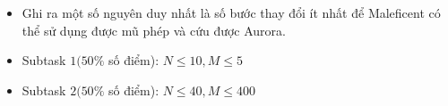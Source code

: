 \documentclass[12pt,a4paper,oneside]{article}
\begin{document}
\begin{itemize}
    \item Ghi ra một số nguyên duy nhất là số bước thay đổi ít nhất để Maleficent có thể sử dụng được mũ phép và cứu được Aurora.
\end{itemize}


\begin{example}
\end{example}



\begin{itemize}
    \item Subtask $1 (50\%$ số điểm): $N \leq 10, M \leq 5$
    \item Subtask $2 (50\%$ số điểm): $N \leq 40, M \leq 400$
\end{itemize}
\end{document}
